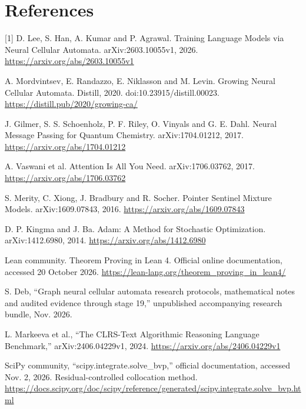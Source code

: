 \documentclass[10pt,letterpaper,twocolumn]{article}
\begin{document}
\section*{References}
[1] D. Lee, S. Han, A. Kumar and P. Agrawal. Training Language Models via Neural Cellular Automata. arXiv:2603.10055v1, 2026. \url{https://arxiv.org/abs/2603.10055v1}\par
[2] A. Mordvintsev, E. Randazzo, E. Niklasson and M. Levin. Growing Neural Cellular Automata. Distill, 2020. doi:10.23915/\allowbreak{}distill.00023. \url{https://distill.pub/2020/growing-ca/}\par
[3] J. Gilmer, S. S. Schoenholz, P. F. Riley, O. Vinyals and G. E. Dahl. Neural Message Passing for Quantum Chemistry. arXiv:1704.01212, 2017. \url{https://arxiv.org/abs/1704.01212}\par
[4] A. Vaswani et al. Attention Is All You Need. arXiv:1706.03762, 2017. \url{https://arxiv.org/abs/1706.03762}\par
[5] S. Merity, C. Xiong, J. Bradbury and R. Socher. Pointer Sentinel Mixture Models. arXiv:1609.07843, 2016. \url{https://arxiv.org/abs/1609.07843}\par
[6] D. P. Kingma and J. Ba. Adam: A Method for Stochastic Optimization. arXiv:1412.6980, 2014. \url{https://arxiv.org/abs/1412.6980}\par
[7] Lean community. Theorem Proving in Lean 4. Official online documentation, accessed 20 October 2026. \url{https://lean-lang.org/theorem_proving_in_lean4/}\par
[8] S. Deb, ``Graph neural cellular automata research protocols, mathematical notes and audited evidence through stage 19,'' unpublished accompanying research bundle, Nov. 2026.\par
[9] L. Markeeva et al., ``The CLRS-Text Algorithmic Reasoning Language Benchmark,'' arXiv:2406.04229v1, 2024. \url{https://arxiv.org/abs/2406.04229v1}\par
[10] SciPy community, ``scipy.integrate.solve\_\allowbreak{}bvp,'' official documentation, accessed Nov. 2, 2026. Residual-controlled collocation method. \url{https://docs.scipy.org/doc/scipy/reference/generated/scipy.integrate.solve_bvp.html}\par
\end{document}

